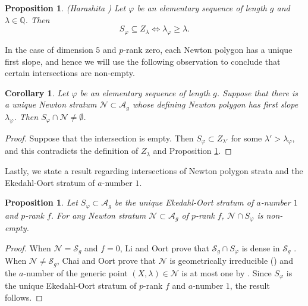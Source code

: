 \documentclass[11pt,table]{amsart}
\newcommand{\Q}{\mathbb{Q}}
\numberwithin{equation}{section}
\newtheorem{prop}[thm]{Proposition}
\newtheorem{cor}[thm]{Corollary}
\theoremstyle{definition}
\theoremstyle{remark}
\theoremstyle{remark}
\begin{document}
\begin{prop}{({\rm Harashita} \cite[Corollary 4.2]{harashitaslope})} \label{firstslope}
Let $\varphi$ be an elementary sequence of length $g$ and  $\lambda \in \Q$. Then
$$S_{\varphi} \subseteq Z_{\lambda} \Leftrightarrow \lambda_{\varphi} \ge \lambda.$$
\end{prop}

In the case of dimension $5$ and $p$-rank zero, each Newton polygon has a unique first slope, and hence we will use the following observation to conclude that certain intersections are non-empty. 
\begin{cor} \label{firstslopecor}
Let $\varphi$ be an elementary sequence of length $g$. Suppose that there is a unique Newton stratum $\mathcal{N} \subset \mathcal{A}_g$  whose defining Newton polygon has first slope $\lambda_{\varphi}$. Then $S_{\varphi} \cap \mathcal{N} \ne \emptyset$.
\end{cor}
\begin{proof}
 Suppose that the intersection is empty. Then $S_{\varphi} \subset Z_{\lambda'}$ for some $\lambda' > \lambda_{\varphi}$, and this contradicts the definition of $Z_{\lambda}$ and Proposition \ref{firstslope}.
\end{proof}

Lastly, we state a result regarding intersections of Newton polygon strata and the Ekedahl-Oort stratum of $a$-number $1$. 
\begin{prop} \label{anumber1intersections}
Let $S_{\varphi} \subset \mathcal{A}_g$ be the unique Ekedahl-Oort stratum of $a$-number $1$ and $p$-rank $f$. For any Newton stratum $\mathcal{N} \subset \mathcal{A}_g$ of $p$-rank $f$, $ \mathcal{N} \cap S_{\varphi}$ is non-empty.    
\end{prop}
\begin{proof}
When $\mathcal{N} = \mathcal{S}_g$ and $f=0$, Li and Oort prove that $\mathcal{S}_g \cap S_{\varphi}$ is dense in $\mathcal{S}_g$ \cite[Theorem 4.9(iii)]{li1680f}. When $\mathcal{N} \ne \mathcal{S}_g$, Chai and Oort prove that $\mathcal{N}$ is geometrically irreducible (\cite[Theorem 3.1]{chai2011monodromy}) and the $a$-number of the generic point $(X, \lambda) \in \mathcal{N}$ is at most one by \cite[Remark 5.4]{oort2000newton}. Since $S_{\varphi}$ is the unique Ekedahl-Oort stratum of $p$-rank $f$ and $a$-number $1$, the result follows.
\end{proof}
\end{document}
